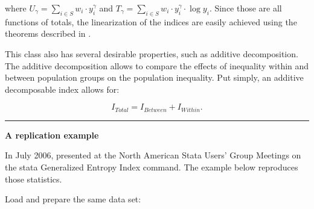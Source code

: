 \documentclass[
]{book}
\begin{document}
where \(U_\gamma = \sum_{i \in S} w_i \cdot y_i^\gamma\) and \(T_\gamma = \sum_{i \in S} w_i \cdot y_i^\gamma \cdot \log y_i\). Since those are all functions of totals, the linearization of the indices are easily achieved using the theorems described in \textcite{deville1999}.

This class also has several desirable properties, such as additive decomposition. The additive decomposition allows to compare the effects of inequality within and between population groups on the population inequality. Put simply, an additive decomposable index allows for:

\[
I_{Total} = I_{Between} + I_{Within} \text{.}
\]

\begin{center}\rule{0.5\linewidth}{0.5pt}\end{center}

\textbf{A replication example}

In July 2006, \textcite{jenkins2006} presented at the North American Stata Users' Group Meetings on the stata Generalized Entropy Index command. The example below reproduces those statistics.

Load and prepare the same data set:
\end{document}
